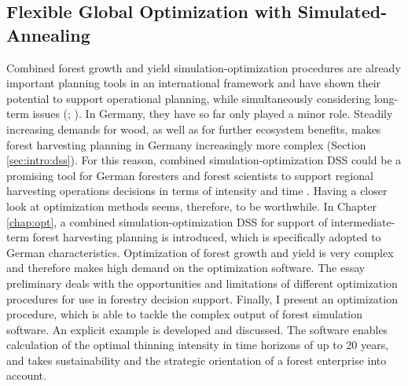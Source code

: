 \subsection{Flexible Global Optimization with Simulated-Annealing}
\label{subsec:intro:struct:opt}
Combined forest growth and yield si\-mu\-la\-tion-op\-ti\-mi\-za\-tion procedures are already important planning tools in an international framework \citep[p. 1]{hoganson_2015} and have shown their potential to support operational planning, while simultaneously considering long-term issues (\citealp[p. 1]{hoganson_2015}; \citealp[p. 1081]{pretzsch_2008}). In Germany, they have so far only played a minor role. Steadily increasing demands for wood, as well as for further ecosystem benefits, makes forest harvesting planning in Germany increasingly more complex (Section \ref{sec:intro:dss}). For this reason, combined si\-mu\-la\-tion-op\-ti\-mi\-za\-tion DSS could be a promising tool for German foresters and forest scientists to support regional harvesting operations decisions in terms of intensity and time \citet[p. 347-348]{mohring_2010}. Having a closer look at optimization methods seems, therefore, to be worthwhile. In Chapter \ref{chap:opt}, a combined si\-mu\-la\-tion-op\-ti\-mi\-za\-tion DSS for support of intermediate-term forest harvesting planning is introduced, which is specifically adopted to German characteristics. Optimization of forest growth and yield is very complex and therefore makes high demand on the optimization software. The essay preliminary deals with the opportunities and limitations of different optimization procedures for use in forestry decision support. Finally, I present an optimization procedure, which is able to tackle the complex output of forest simulation software. An explicit example is developed and discussed. The software enables calculation of the optimal thinning intensity in time horizons of up to 20 years, and takes sustainability and the strategic orientation of a forest enterprise into account.

